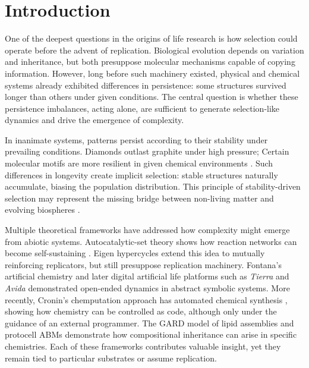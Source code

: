 \documentclass[life,article,submit,pdftex,moreauthors]{Definitions/mdpi}
\begin{document}
\section{Introduction}

One of the deepest questions in the origins of life research is how selection could operate before the advent of replication. Biological evolution depends on variation and inheritance, but both presuppose molecular mechanisms capable of copying information. However, long before such machinery existed, physical and chemical systems already exhibited differences in persistence: some structures survived longer than others under given conditions. The central question is whether these persistence imbalances, acting alone, are sufficient to generate selection-like dynamics and drive the emergence of complexity.

In inanimate systems, patterns persist according to their stability under prevailing conditions. Diamonds outlast graphite under high pressure; Certain molecular motifs are more resilient in given chemical environments \cite{ruizmirazo2014}. Such differences in longevity create implicit selection: stable structures naturally accumulate, biasing the population distribution. This principle of stability-driven selection may represent the missing bridge between non-living matter and evolving biospheres \cite{hordijk2012autocatalytic, nghe2015prebiotic}.

Multiple theoretical frameworks have addressed how complexity might emerge from abiotic systems. Autocatalytic-set theory shows how reaction networks can become self-sustaining \cite{kauffman1986autocatalytic, hordijk2011required}. Eigen hypercycles \cite{eigen} extend this idea to mutually reinforcing replicators, but still presuppose replication machinery. Fontana's artificial chemistry \cite{fontana1991algorithmic} and later digital artificial life platforms such as \textit{Tierra} and \textit{Avida} \cite{ray1992tierra, adami1994} demonstrated open-ended dynamics in abstract symbolic systems. More recently, Cronin’s chemputation approach has automated chemical synthesis \cite{cronin2024chemputation}, showing how chemistry can be controlled as code, although only under the guidance of an external programmer. The GARD model of lipid assemblies \cite{segre2000compositional, markovitch2012universal} and protocell ABMs \cite{damer2015coupled} demonstrate how compositional inheritance can arise in specific chemistries. Each of these frameworks contributes valuable insight, yet they remain tied to particular substrates or assume replication.
\end{document}
